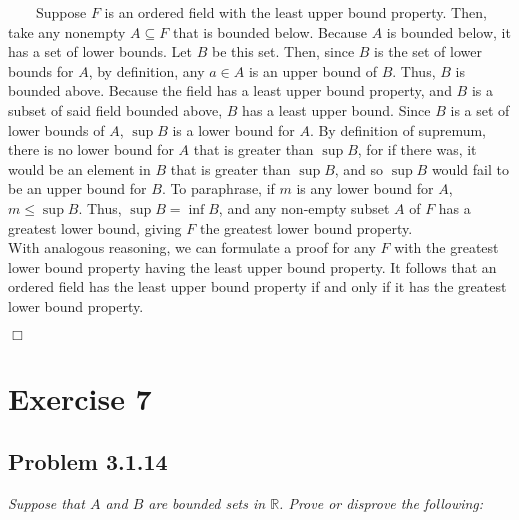 \documentclass[
]{article}
\begin{document}
~~~~Suppose \(F\) is an ordered field with the least upper bound
property. Then, take any nonempty \(A \subseteq F\) that is bounded
below. Because \(A\) is bounded below, it has a set of lower bounds. Let
\(B\) be this set. Then, since \(B\) is the set of lower bounds for
\(A\), by definition, any \(a \in A\) is an upper bound of \(B\). Thus,
\(B\) is bounded above. Because the field has a least upper bound
property, and \(B\) is a subset of said field bounded above, \(B\) has a
least upper bound. Since \(B\) is a set of lower bounds of \(A\),
\(\sup B\) is a lower bound for \(A\). By definition of supremum, there
is no lower bound for \(A\) that is greater than \(\sup B\), for if
there was, it would be an element in \(B\) that is greater than
\(\sup B\), and so \(\sup B\) would fail to be an upper bound for \(B\).
To paraphrase, if \(m\) is any lower bound for \(A\), \(m \leq \sup B\).
Thus, \(\sup B = \inf B\), and any non-empty subset \(A\) of \(F\) has a
greatest lower bound, giving \(F\) the greatest lower bound property.\\
\hspace*{0.333em}\hspace*{0.333em}\hspace*{0.333em}\hspace*{0.333em}With
analogous reasoning, we can formulate a proof for any \(F\) with the
greatest lower bound property having the least upper bound property. It
follows that an ordered field has the least upper bound property if and
only if it has the greatest lower bound property.

\hfill \(\Box\)

\hypertarget{exercise-7}{%
\section{Exercise 7}\label{exercise-7}}

\hypertarget{problem-3.1.14}{%
\subsection{Problem 3.1.14}\label{problem-3.1.14}}

\emph{Suppose that \(A\) and \(B\) are bounded sets in \(\mathbb{R}\).
Prove or disprove the following:}\\
\end{document}
